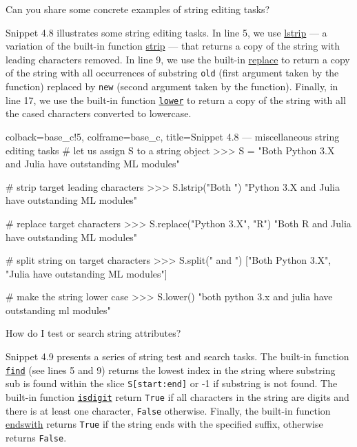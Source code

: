 \documentclass[a4paper,11pt]{book}
\newcommand{\question}[1]{%
    \begin{tcolorbox}[colback=comp_c!10,colframe=comp_c,sidebyside align=top,width=\linewidth,before skip=1ex]
        #1
    \end{tcolorbox}
    \switchcolumn%
}
\newcommand{\note}[1]{%
    \begin{tcolorbox}[colback=white!0,colframe=white!10,width=\linewidth,before skip=1ex]
        #1
    \end{tcolorbox}
}
\begin{document}
\begin{paracol}{2}
	\question{\raggedright Can you share some concrete examples of string editing tasks?}
	\note{Snippet 4.8 illustrates some string editing tasks. In line 5, we use \href{https://docs.python.org/3/library/stdtypes.html\#str.format}{lstrip} --- a variation of the built-in function \href{https://docs.python.org/3/library/stdtypes.html\#str.format}{strip} --- that returns a copy of the string with leading characters removed. In line 9, we use the built-in \href{https://docs.python.org/3/library/stdtypes.html}{replace} to return a copy of the string with all occurrences of substring \texttt{old} (first argument taken by the function) replaced by \texttt{new} (second argument taken by the function). Finally, in line 17, we use the built-in function \href{https://docs.python.org/3/library/stdtypes.html}{\texttt{lower}} to return a copy of the string with all the cased characters converted to lowercase.} 
\end{paracol}

\begin{pythoncode}[linenos=true,]{colback=base_c!5, colframe=base_c, title=\sffamily Snippet 4.8 --- miscellaneous string editing tasks}
# let us assign S to a string object
>>> S = "Both Python 3.X and Julia have outstanding ML modules"

# strip target leading characters
>>> S.lstrip("Both ")
"Python 3.X and Julia have outstanding ML modules"

# replace target characters
>>> S.replace("Python 3.X", "R")
"Both R and Julia have outstanding ML modules"

# split string on target characters
>>> S.split(" and ")
["Both Python 3.X", "Julia have outstanding ML modules"]

# make the string lower case
>>> S.lower() 
"both python 3.x and julia have outstanding ml modules"
\end{pythoncode}

\begin{paracol}{2}
\question{How do I test or search string attributes?}
\note{Snippet 4.9 presents a series of string test and search tasks. The built-in function \href{https://docs.python.org/3/library/stdtypes.html}{\texttt{find}} (see lines 5 and 9) returns the lowest index in the string where substring sub is found within the slice \texttt{S[start:end]} or -1 if substring is not found.	The built-in function \href{https://docs.python.org/3/library/stdtypes.html}{\texttt{isdigit}} return \texttt{True} if all characters in the string are digits and there is at least one character, \texttt{False} otherwise. Finally, the built-in function \href{https://docs.python.org/3/library/stdtypes.html}{endswith} returns \texttt{True} if the string ends with the specified suffix, otherwise returns \texttt{False}.}
\end{paracol}
\end{document}
